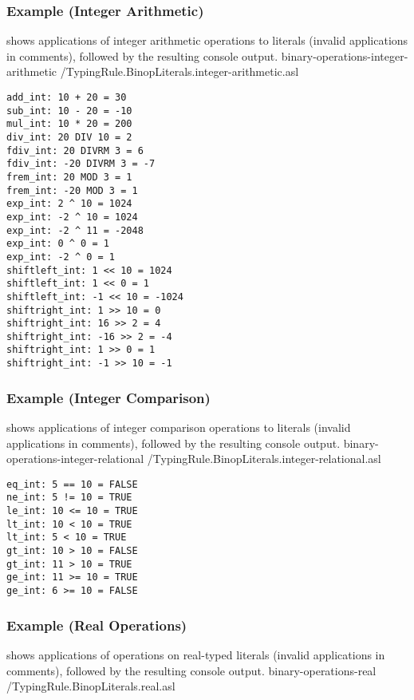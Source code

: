 \subsubsection{Example (Integer Arithmetic)\label{sec:IntegerArithmetic}}
 shows applications
of integer arithmetic operations to literals (invalid applications in comments),
followed by the resulting console output.
  {binary-operations-integer-arithmetic}
  {\typingtests/TypingRule.BinopLiterals.integer-arithmetic.asl}

\begin{Verbatim}[fontsize=\footnotesize, frame=single]
add_int: 10 + 20 = 30
sub_int: 10 - 20 = -10
mul_int: 10 * 20 = 200
div_int: 20 DIV 10 = 2
fdiv_int: 20 DIVRM 3 = 6
fdiv_int: -20 DIVRM 3 = -7
frem_int: 20 MOD 3 = 1
frem_int: -20 MOD 3 = 1
exp_int: 2 ^ 10 = 1024
exp_int: -2 ^ 10 = 1024
exp_int: -2 ^ 11 = -2048
exp_int: 0 ^ 0 = 1
exp_int: -2 ^ 0 = 1
shiftleft_int: 1 << 10 = 1024
shiftleft_int: 1 << 0 = 1
shiftleft_int: -1 << 10 = -1024
shiftright_int: 1 >> 10 = 0
shiftright_int: 16 >> 2 = 4
shiftright_int: -16 >> 2 = -4
shiftright_int: 1 >> 0 = 1
shiftright_int: -1 >> 10 = -1
\end{Verbatim}

\subsubsection{Example (Integer Comparison)\label{sec:IntegerComparison}}
 shows applications
of integer comparison operations to literals (invalid applications in comments),
followed by the resulting console output.
  {binary-operations-integer-relational}
  {\typingtests/TypingRule.BinopLiterals.integer-relational.asl}

\begin{Verbatim}[fontsize=\footnotesize, frame=single]
eq_int: 5 == 10 = FALSE
ne_int: 5 != 10 = TRUE
le_int: 10 <= 10 = TRUE
lt_int: 10 < 10 = TRUE
lt_int: 5 < 10 = TRUE
gt_int: 10 > 10 = FALSE
gt_int: 11 > 10 = TRUE
ge_int: 11 >= 10 = TRUE
ge_int: 6 >= 10 = FALSE
\end{Verbatim}

\subsubsection{Example (Real Operations)\label{sec:RealOperations}}
 shows applications
of operations on real-typed literals (invalid applications in comments),
followed by the resulting console output.
  {binary-operations-real}
  {\typingtests/TypingRule.BinopLiterals.real.asl}

